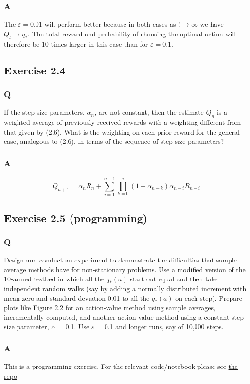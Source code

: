 \documentclass[a4paper, oneside, 11pt]{article}
\newcommand\ProgrammingExercise{This is a programming exercise. For the relevant code/notebook please see \href{https://github.com/brynhayder}{the repo}.}
\begin{document}
\subsubsection{A}
The $\varepsilon = 0.01$ will perform better because in both cases as $t \to \infty$ we have $Q_t \to q_*$. The total reward and probability of choosing the optimal action will therefore be 10 times larger in this case than for $\varepsilon = 0.1$.


\subsection{Exercise 2.4}
\subsubsection{Q}
If the step-size parameters, $\alpha_n$, are not constant, then the estimate $Q_n$ is a weighted average of previously received rewards with a weighting different from that given by (2.6). What is the weighting on each prior reward for the general case, analogous to (2.6), in terms of the sequence of step-size parameters?

\subsubsection{A}
\begin{equation}
    Q_{n + 1} = \alpha_n R_n + \sum_{i = 1}^{n - 1} \prod_{k = 0}^i
(1 - \alpha_{n - k}) \alpha_{n - i} R_{n - i}
\end{equation}

\subsection{Exercise 2.5 (programming)}
\subsubsection{Q}
Design and conduct an experiment to demonstrate the difficulties that sample-average methods have for non-stationary problems. Use a modified version of the 10-armed testbed in which all the $q_*(a)$ start out equal and then take independent random walks (say by adding a normally distributed increment with mean zero and standard deviation 0.01 to all the $q_*(a)$ on each step). Prepare plots like Figure 2.2 for an action-value method using sample averages, incrementally computed, and another action-value method using a constant step-size parameter, $\alpha$ = 0.1. Use $\varepsilon$ = 0.1 and longer runs, say of 10,000 steps.

\subsubsection{A}
\ProgrammingExercise
\end{document}
